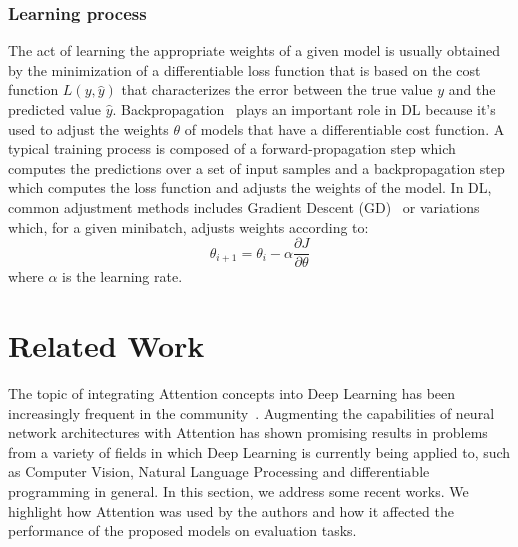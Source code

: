 \documentclass[English]{style/ic-tese-v3}
\begin{document}
\subsection{Learning process}
The act of learning the appropriate weights of a given model
is usually obtained by the minimization of a differentiable loss function
that is based on the cost function $L(y, \hat{y})$ that characterizes the error
between the true value $y$ and the predicted value $\hat{y}$.
Backpropagation~\cite{ref:backprop} plays an important role in DL because it's used
to adjust the weights $\theta$ of models that have a
differentiable cost function.
A typical training process is composed of a forward-propagation
step which computes the predictions over a set of input samples
and a backpropagation step which computes the loss function
and adjusts the weights of the model.
In DL, common adjustment methods includes Gradient Descent (GD)~\cite{ref:gd} or variations
which, for a given minibatch, adjusts weights according to:
$$\theta_{i+1} = \theta_i - \alpha\frac{\partial{J}}{\partial{\theta}}$$
where $\alpha$ is the learning rate.

\let\clearpage\relax
\newpage

\chapter{Related Work} \label{sess:related-work}
The topic of integrating Attention concepts into Deep Learning has been increasingly frequent
in the community~\cite{ref:att-survey}.
Augmenting the capabilities of neural network architectures with Attention has shown promising results
in problems from a variety of fields in which Deep Learning is currently being applied to, such as
Computer Vision, Natural Language Processing and differentiable programming in general.
In this section, we address some recent works.
We highlight how Attention was used by the authors and how it affected the performance of the proposed models
on evaluation tasks.
\end{document}
